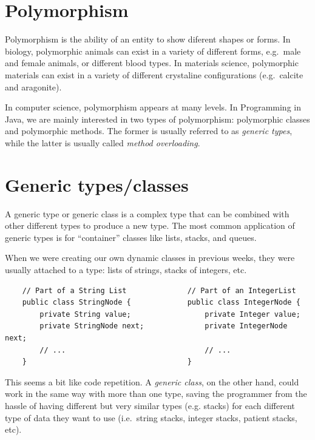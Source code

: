 
\section{Polymorphism}
\label{sec:polymorphyism}

Polymorphism is the ability of an entity to show diferent shapes or
forms. In biology, polymorphic animals can exist in a variety of
different forms, e.g.~male and female animals, or different blood
types. In materials science, polymorphic materials can exist in a
variety of different crystaline configurations (e.g.~calcite and
aragonite). 

In computer science, polymorphism appears at many levels. In
Programming in Java, we are mainly interested in two types of polymorphism:
polymorphic classes and polymorphic methods. The former is usually
referred to as \emph{generic types}, while the latter is usually
called \emph{method overloading}. 

\section{Generic types/classes}
\label{sec:generic-types}

A generic type or generic class
is a complex type that can be combined with other
different types to produce a new type. 
The most common application of generic types is for
``container'' classes like lists, stacks, and queues. 

When we were creating our own dynamic classes in previous weeks, they
were usually attached to a type: lists of strings, stacks of integers,
etc. 

\begin{verbatim}
    // Part of a String List              // Part of an IntegerList
    public class StringNode {             public class IntegerNode {
        private String value;                 private Integer value;
        private StringNode next;              private IntegerNode next;
        // ...                                // ...
    }                                     }
\end{verbatim}

This seems a bit like code repetition. A \emph{generic class}, on the 
other hand, could work in the same way with more than one
type, saving the programmer from the hassle of having different but very
similar types (e.g. stacks) for each different type of data they want
to use (i.e.~string stacks, integer stacks, patient stacks, etc). 

